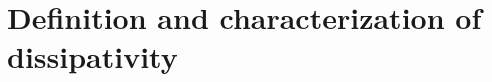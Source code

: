 \documentclass[aspectratio=169]{beamer}
\newcommand{\bbR}{\mathbb{R}}
\begin{document}

\section{Definition and characterization of dissipativity}
\end{document}
